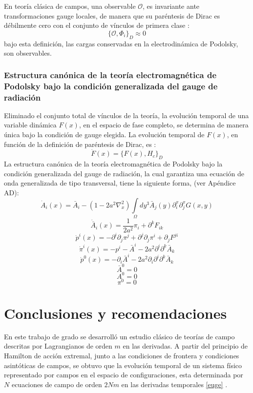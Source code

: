 \documentclass[a4paper,12pt]{article}
\begin{document}
En teoría clásica de campos, una observable $\mathcal{O}$, es invariante ante transformaciones gauge locales, de manera que su paréntesis de Dirac es débilmente cero con el conjunto de vínculos de primera clase \cite{puebla}:
\begin{equation}
\{\mathcal{O},\Phi_i\}_D\approx0 
\end{equation}
bajo esta definición, las cargas conservadas en la electrodinámica de Podolsky, son observables. 
\subsubsection{Estructura canónica de la teoría electromagnética de Podolsky bajo la condición generalizada del gauge de radiación}
Eliminado el conjunto total de vínculos de la teoría, la evolución temporal de una variable dinámica $F(x)$, en el espacio de fase completo, se determina de manera única bajo la condición de gauge elegida. La evolución temporal de $F(x)$, en función de la definición de paréntesis de Dirac, es \cite{dirac,puebla,Merilin}:
\begin{equation}
\dot F(x)=\{ F(x),H_c\}_D 
\end{equation}
La estructura canónica de la teoría electromagnética de Podolsky bajo la condición generalizada del gauge de radiación, la cual garantiza una ecuación de onda generalizada de tipo transversal, tiene la siguiente forma, (ver Apéndice AD):
\begin{equation}
\dot{A}_i(x)=\bar{A}_i-(1-2a^2\nabla^2_x)\int\limits_{\Omega}dy^{3}\bar{A}_j(y)\partial_i^x\partial_j^xG(x,y)
\label{diech}
\end{equation}
$$\dot{\bar{A}}_i(x)=\frac{1}{2a^2}\pi_i+\partial^k F_{ik}$$
$$\dot{p}^i(x)=-\partial^i\partial_j\pi^{j}+\partial^j\partial_j\pi^{i}+\partial_jF^{ji}$$
$$\dot{\pi}^i(x)=-p^{i}-\bar{A}^i-2a^2\partial^i\partial^k\bar{A}_k$$
$$\dot{p}^0(x)=-\partial_i\bar{A}^i-2a^2\partial_i\partial^i\partial^k\bar{A}_k$$
$$\bar{A}^0=0$$
$$A^0=0$$
$$\pi^0=0$$
\newpage
\section{Conclusiones y recomendaciones}
En este trabajo de grado se desarrolló un estudio clásico de teorías de campo descritas por Lagrangianos de orden $m$ en las derivadas. A partir del principio de Hamilton de acción extremal, junto a las condiciones de frontera y condiciones asintóticas de campos, se obtuvo que la evolución temporal de un sistema físico representado por campos en el espacio de configuraciones, esta determinada por $N$ ecuaciones de campo de orden $2Nm$ en las derivadas temporales \eqref{euge} \cite{general}.  
\\
\end{document}
